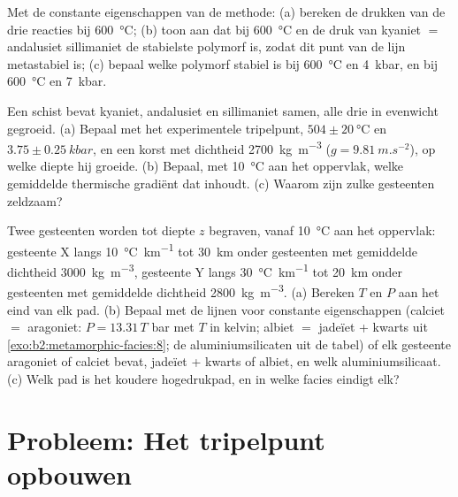 \begin{exercise}[$\star\star\star$]\label{exo:b2:metamorphic-facies:10}
Met de constante eigenschappen van de methode: (a) bereken de drukken van de drie
reacties bij \qty{600}{\celsius}; (b) toon aan dat bij \qty{600}{\celsius} en de druk van
kyaniet $=$ andalusiet sillimaniet de stabielste polymorf is, zodat dit punt van
de lijn metastabiel is; (c) bepaal welke polymorf stabiel is bij \qty{600}{\celsius} en
\qty{4}{kbar}, en bij \qty{600}{\celsius} en \qty{7}{kbar}.
\end{exercise}

\begin{exercise}[$\star\star\star$]\label{exo:b2:metamorphic-facies:11}
Een schist bevat kyaniet, andalusiet en sillimaniet samen, alle drie in
evenwicht gegroeid. (a) Bepaal met het experimentele tripelpunt, $504 \pm \qty{20}{\celsius}$ en
$3.75 \pm \qty{0.25}{kbar}$, en een korst met dichtheid \qty{2700}{kg.m^{-3}} ($g =
\qty{9.81}{m.s^{-2}}$), op welke diepte hij groeide. (b) Bepaal, met \qty{10}{\celsius} aan het
oppervlak, welke gemiddelde thermische gradiënt dat inhoudt. (c) Waarom zijn zulke gesteenten zeldzaam?
\end{exercise}

\begin{exercise}[$\star\star\star$]\label{exo:b2:metamorphic-facies:12}
Twee gesteenten worden tot diepte $z$ begraven, vanaf \qty{10}{\celsius} aan het oppervlak: gesteente X langs
\qty{10}{\celsius.km^{-1}} tot \qty{30}{km} onder gesteenten met gemiddelde dichtheid
\qty{3000}{kg.m^{-3}}, gesteente Y langs \qty{30}{\celsius.km^{-1}} tot \qty{20}{km} onder gesteenten
met gemiddelde dichtheid \qty{2800}{kg.m^{-3}}. (a) Bereken $T$ en $P$ aan het eind van elk pad.
(b) Bepaal met de lijnen voor constante eigenschappen (calciet $=$ aragoniet: $P = 13.31\,T$ bar met $T$
in kelvin; albiet $=$ jadeïet + kwarts uit \cref{exo:b2:metamorphic-facies:8}; de aluminiumsilicaten uit de
tabel) of elk gesteente aragoniet of calciet bevat, jadeïet + kwarts of albiet, en welk
aluminiumsilicaat. (c) Welk pad is het koudere hogedrukpad, en in welke facies eindigt elk?
\end{exercise}

\section{Probleem: Het tripelpunt opbouwen}

